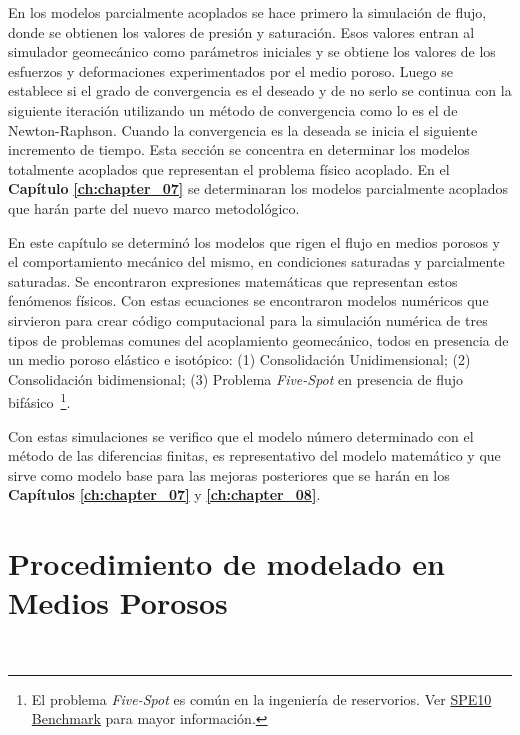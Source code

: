 En los modelos parcialmente acoplados se hace primero la simulación de flujo, donde se obtienen los valores de presión y saturación. Esos valores entran al simulador geomecánico como parámetros iniciales y se obtiene los valores de los esfuerzos y deformaciones experimentados por el medio poroso. Luego se establece si el grado de convergencia es el deseado y de no serlo se continua con la siguiente iteración utilizando un método de convergencia como lo es el de Newton-Raphson. Cuando la convergencia es la deseada se inicia el siguiente incremento de tiempo. Esta sección se concentra en determinar los modelos totalmente acoplados que representan el problema físico acoplado. En el \textbf{Capítulo} \textbf{\ref{ch:chapter_07}} se determinaran los modelos parcialmente acoplados que harán parte del nuevo marco metodológico.\bigskip

En este capítulo se determinó los modelos que rigen el flujo en medios porosos y el comportamiento mecánico del mismo, en condiciones saturadas y parcialmente saturadas. Se encontraron expresiones matemáticas que representan estos fenómenos físicos. Con estas ecuaciones se encontraron modelos numéricos que sirvieron para crear código computacional para la simulación numérica de tres tipos de problemas comunes del acoplamiento geomecánico, todos en presencia de un medio poroso elástico e isotópico: (1) Consolidación Unidimensional; (2) Consolidación bidimensional; (3) Problema \textit{Five-Spot} en presencia de flujo bifásico~\footnote{El problema \textit{Five-Spot} es común en la ingeniería de reservorios. Ver \href{https://www.spe.org/web/csp/datasets/set02.htm}{SPE10 Benchmark} para mayor información.}.\bigskip

Con estas simulaciones se verifico que el modelo número determinado con el método de las diferencias finitas, es representativo del modelo matemático y que sirve como modelo base para las mejoras posteriores que se harán en los \textbf{Capítulos} \textbf{\ref{ch:chapter_07}} y \textbf{\ref{ch:chapter_08}}.



\section{Procedimiento de modelado en Medios Porosos}~\hypertarget{sec:sec310}{}
\label{sec:sec310}

